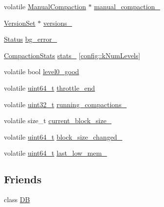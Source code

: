 \begin{DoxyCompactItemize}
\item 
volatile \hyperlink{structleveldb_1_1_d_b_impl_1_1_manual_compaction}{Manual\+Compaction} $\ast$ \hyperlink{classleveldb_1_1_d_b_impl_ad5a0065e05c6f53c5032240cd657867a}{manual\+\_\+compaction\+\_\+}
\item 
\hyperlink{classleveldb_1_1_version_set}{Version\+Set} $\ast$ \hyperlink{classleveldb_1_1_d_b_impl_a2de2ccb92789a687ba89765f39ec3b2f}{versions\+\_\+}
\item 
\hyperlink{classleveldb_1_1_status}{Status} \hyperlink{classleveldb_1_1_d_b_impl_aa44e740550e1b32342e647d1876ee640}{bg\+\_\+error\+\_\+}
\item 
\hyperlink{structleveldb_1_1_d_b_impl_1_1_compaction_stats}{Compaction\+Stats} \hyperlink{classleveldb_1_1_d_b_impl_a74619130ba7f16b371202bff08346d18}{stats\+\_\+} \mbox{[}\hyperlink{namespaceleveldb_1_1config_ab6017947ae68898c606643bddc0f5b9c}{config\+::k\+Num\+Levels}\mbox{]}
\item 
volatile bool \hyperlink{classleveldb_1_1_d_b_impl_a2cc7bf3f9c95e0aa5cbbfdebc094a88b}{level0\+\_\+good}
\item 
volatile \hyperlink{stdint_8h_aaa5d1cd013383c889537491c3cfd9aad}{uint64\+\_\+t} \hyperlink{classleveldb_1_1_d_b_impl_a1908c0e18c994b35df129b1a6ad48f3d}{throttle\+\_\+end}
\item 
volatile \hyperlink{stdint_8h_a435d1572bf3f880d55459d9805097f62}{uint32\+\_\+t} \hyperlink{classleveldb_1_1_d_b_impl_ae1942f4687588bf8988c1d1f7cc8e8b3}{running\+\_\+compactions\+\_\+}
\item 
volatile size\+\_\+t \hyperlink{classleveldb_1_1_d_b_impl_a1abed98c17920fa389405afa06314fa6}{current\+\_\+block\+\_\+size\+\_\+}
\item 
volatile \hyperlink{stdint_8h_aaa5d1cd013383c889537491c3cfd9aad}{uint64\+\_\+t} \hyperlink{classleveldb_1_1_d_b_impl_af30fcc217a1342db147b56300151499a}{block\+\_\+size\+\_\+changed\+\_\+}
\item 
volatile \hyperlink{stdint_8h_aaa5d1cd013383c889537491c3cfd9aad}{uint64\+\_\+t} \hyperlink{classleveldb_1_1_d_b_impl_aae8e413e42654ae61252ac6e952d4db8}{last\+\_\+low\+\_\+mem\+\_\+}
\end{DoxyCompactItemize}
\subsection*{Friends}
\begin{DoxyCompactItemize}
\item 
class \hyperlink{classleveldb_1_1_d_b_impl_ad22eb7a23cbf34de526efa966c578d4a}{D\+B}
\end{DoxyCompactItemize}
